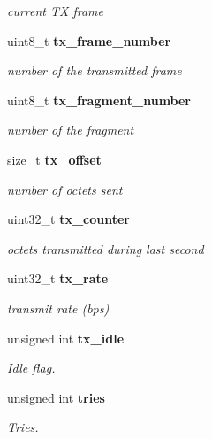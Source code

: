 \begin{DoxyCompactItemize}
\begin{DoxyCompactList}\small\item\em current T\-X frame \end{DoxyCompactList}\item 
uint8\-\_\-t {\bf tx\-\_\-frame\-\_\-number}\label{structec__eoe_aa662995414d6117c623a67d7d3807bfc}

\begin{DoxyCompactList}\small\item\em number of the transmitted frame \end{DoxyCompactList}\item 
uint8\-\_\-t {\bf tx\-\_\-fragment\-\_\-number}\label{structec__eoe_a3ee417a7b394d57b0ba1e7513e24f8b6}

\begin{DoxyCompactList}\small\item\em number of the fragment \end{DoxyCompactList}\item 
size\-\_\-t {\bf tx\-\_\-offset}\label{structec__eoe_a77e698a64338945f1c57b75771881255}

\begin{DoxyCompactList}\small\item\em number of octets sent \end{DoxyCompactList}\item 
uint32\-\_\-t {\bf tx\-\_\-counter}\label{structec__eoe_aacdbf76b955e5aeb7f1d627a2ca93af5}

\begin{DoxyCompactList}\small\item\em octets transmitted during last second \end{DoxyCompactList}\item 
uint32\-\_\-t {\bf tx\-\_\-rate}\label{structec__eoe_abfaa2eb7e9ff799e9872a49819177448}

\begin{DoxyCompactList}\small\item\em transmit rate (bps) \end{DoxyCompactList}\item 
unsigned int {\bf tx\-\_\-idle}
\begin{DoxyCompactList}\small\item\em Idle flag. \end{DoxyCompactList}\item 
unsigned int {\bf tries}
\begin{DoxyCompactList}\small\item\em Tries. \end{DoxyCompactList}\end{DoxyCompactItemize}


